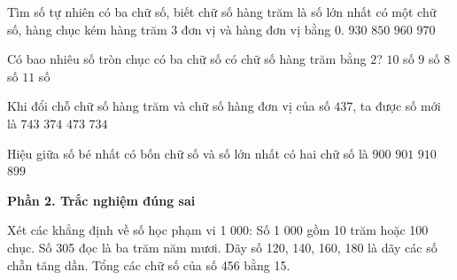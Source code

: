 \begin{ex} %
Tìm số tự nhiên có ba chữ số, biết chữ số hàng trăm là số lớn nhất có một chữ số, hàng chục kém hàng trăm 3 đơn vị và hàng đơn vị bằng 0.
\choice
{$930$}
{$850$}
{\True $960$}
{$970$}
\end{ex}

\begin{ex} %
Có bao nhiêu số tròn chục có ba chữ số có chữ số hàng trăm bằng $2$?
\choice
{\True $10$ số}
{$9$ số}
{$8$ số}
{$11$ số}
\end{ex}

\begin{ex} %
Khi đổi chỗ chữ số hàng trăm và chữ số hàng đơn vị của số $437$, ta được số mới là
\choice
{$743$}
{$374$}
{$473$}
{\True $734$}
\end{ex}

\begin{ex} %
Hiệu giữa số bé nhất có bốn chữ số và số lớn nhất có hai chữ số là
\choice
{$900$}
{\True $901$}
{$910$}
{$899$}
\end{ex}

\textbf{Phần 2. Trắc nghiệm đúng sai}

\begin{ex} %
Xét các khẳng định về số học phạm vi 1 000:
\choiceTF
{\True Số 1 000 gồm 10 trăm hoặc 100 chục.}
{Số 305 đọc là ba trăm năm mươi.}
{\True Dãy số 120, 140, 160, 180 là dãy các số chẵn tăng dần.}
{\True Tổng các chữ số của số 456 bằng 15.}
\end{ex}


